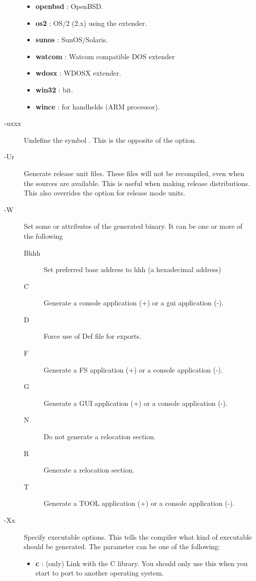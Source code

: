 \begin{description}
\begin{itemize}
\item \textbf{openbsd} : OpenBSD.
\item \textbf{os2} : OS/2 (2.x) using the  extender.
\item \textbf{sunos} : SunOS/Solaris.
\item \textbf{watcom} : Watcom compatible DOS extender
\item \textbf{wdosx} : WDOSX extender.
\item \textbf{win32} :  bit.
\item \textbf{wince} : \windows for handhelds (ARM processor).
\end{itemize}
\item [-uxxx]  Undefine the symbol . This is the opposite
of the  option.
\item [-Ur]  Generate release unit files. These files will not be
recompiled, even when the sources are available. This is useful when making
release distributions. This also overrides the  option for release 
mode units.
\item[-W] Set some \windows or \ostwo attributes of the generated binary. It
can be one or more of the following
\begin{description}
\item[Bhhh] Set preferred base address to hhh (a hexadecimal address)
\item[C] Generate a console application (+) or a gui application (-).
\item[D] Force use of Def file for exports.
\item[F] Generate a FS application (+) or a console application (-).
\item[G] Generate a GUI application (+) or a console application (-).
\item[N] Do not generate a relocation section.
\item[R] Generate a relocation section.
\item[T] Generate a TOOL application (+) or a console application (-).
\end{description}
\item [-Xx]  Specify executable options. This tells the compiler what
kind of executable should be generated. The parameter 
can be one of the following:
\begin{itemize}
\item \textbf{c} : (\linux only) Link with the C library. You should only use this when
  you start to port \fpc to another operating system. 

\end{itemize}
\end{description}

